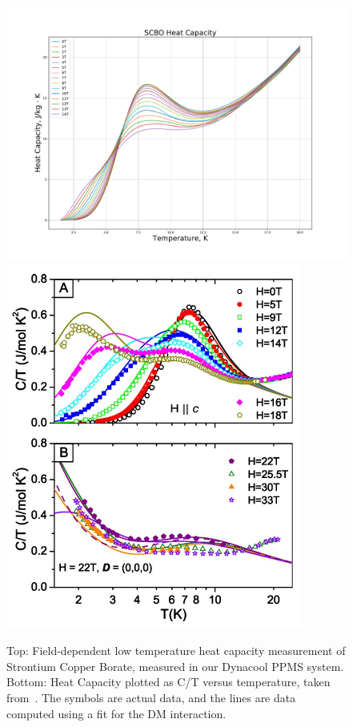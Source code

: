 \documentclass{thesis-umich}
\begin{document}
\begin{figure}
	\centering
	\caption[Low Temperature Heat Capacity of SCBO]{Top: Field-dependent low temperature heat capacity measurement of Strontium Copper Borate, measured in our Dynacool PPMS system. Bottom: Heat Capacity plotted as C/T versus temperature, taken from~\cite{Jorge2005}. The symbols are actual data, and the lines are data computed using a fit for the DM interaction.}
	\includegraphics[width=\columnwidth]{figures/SCBO_total_HC.pdf}
	\includegraphics[width=0.5\columnwidth]{figures/SCBO_HC_Jorge_2005.pdf}
\end{figure}
\end{document}
